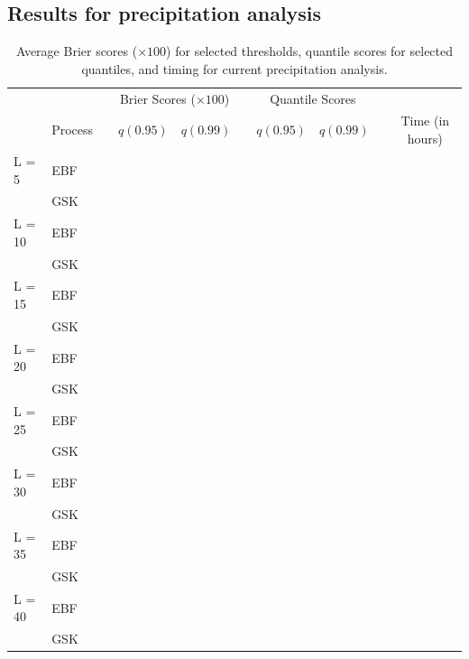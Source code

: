 \documentclass[11pt]{article}
\begin{document}
\subsection{Results for precipitation analysis}\label{ebs:results-precip}

\begin{table}[htbp]
\caption{Average Brier scores ($\times 100$) for selected thresholds, quantile scores for selected quantiles, and timing for current precipitation analysis.}
\label{ebtbl:firescores}
\centering
  \begin{tabular}{llcrrcrrcc}
  \toprule
  & & \phantom{ab} & \multicolumn{2}{c}{Brier Scores ($\times 100$)} & \phantom{abc} & \multicolumn{2}{c}{Quantile Scores} & \phantom{ab} & \\
  \cmidrule{4-5} \cmidrule{7-8}
  & Process && $q(0.95)$ & $q(0.99)$ && $q(0.95)$ & $q(0.99)$ && Time (in hours)\\
  \midrule
  L = 5  & EBF &&  &  &&  &  && \\
         & GSK &&  &  &&  &  && \\
  \midrule
  L = 10 & EBF &&  &  &&  &  && \\
         & GSK &&  &  &&  &  && \\
  \midrule
  L = 15 & EBF &&  &  &&  &  && \\
         & GSK &&  &  &&  &  && \\
  \midrule
  L = 20 & EBF &&  &  &&  &  && \\
         & GSK &&  &  &&  &  && \\
  \midrule
  L = 25 & EBF &&  &  &&  &  && \\
         & GSK &&  &  &&  &  && \\
  \midrule
  L = 30 & EBF &&  &  &&  &  && \\
         & GSK &&  &  &&  &  && \\
  \midrule
  L = 35 & EBF &&  &  &&  &  && \\
         & GSK &&  &  &&  &  && \\
  \midrule
  L = 40 & EBF &&  &  &&  &  && \\
         & GSK &&  &  &&  &  && \\
  \bottomrule
  \end{tabular}
\end{table}
\end{document}
